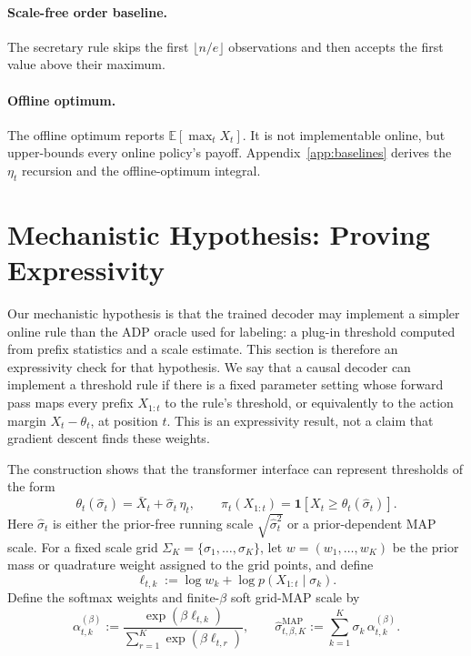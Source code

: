 \documentclass[11pt]{article}
\begin{document}
\paragraph{Scale-free order baseline.}
The secretary rule skips the first \(\lfloor n/e\rfloor\) observations and then accepts the first value above their maximum.

\paragraph{Offline optimum.}
The offline optimum reports \(\mathbb{E}[\max_t X_t]\). It is not implementable online, but upper-bounds every online policy's payoff. Appendix~\ref{app:baselines} derives the \(\eta_t\) recursion and the offline-optimum integral.

\section{Mechanistic Hypothesis: Proving Expressivity}
\label{sec:mechanistic-expressivity}

Our mechanistic hypothesis is that the trained decoder may implement a simpler online rule than the ADP oracle used for labeling: a plug-in threshold computed from prefix statistics and a scale estimate. This section is therefore an expressivity check for that hypothesis. We say that a causal decoder can implement a threshold rule if there is a fixed parameter setting whose forward pass maps every prefix \(X_{1:t}\) to the rule's threshold, or equivalently to the action margin \(X_t-\theta_t\), at position \(t\). This is an expressivity result, not a claim that gradient descent finds these weights.

The construction shows that the transformer interface can represent thresholds of the form
\[
\theta_t(\hat\sigma_t)=\bar X_t+\hat\sigma_t\,\eta_t,
\qquad
\pi_t(X_{1:t})=\mathbf{1}[X_t\ge \theta_t(\hat\sigma_t)].
\]
Here \(\hat\sigma_t\) is either the prior-free running scale \(\sqrt{\hat\sigma_t^2}\) or a prior-dependent MAP scale. For a fixed scale grid \(\Sigma_K=\{\sigma_1,\ldots,\sigma_K\}\), let \(w=(w_1,\ldots,w_K)\) be the prior mass or quadrature weight assigned to the grid points, and define
\[
\ell_{t,k}:=\log w_k+\log p(X_{1:t}\mid \sigma_k).
\]
Define the softmax weights and finite-\(\beta\) soft grid-MAP scale by
\[
\alpha_{t,k}^{(\beta)}
:=
\frac{\exp(\beta\ell_{t,k})}{\sum_{r=1}^K\exp(\beta\ell_{t,r})},
\qquad
\hat\sigma^{\mathrm{MAP}}_{t,\beta,K}
:=
\sum_{k=1}^K \sigma_k\,\alpha_{t,k}^{(\beta)}.
\]
\end{document}
